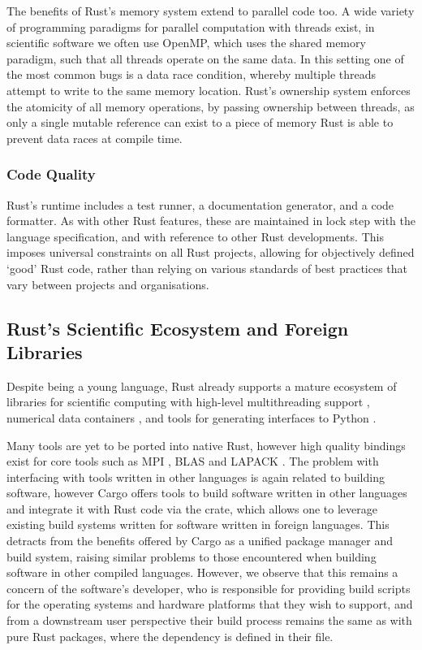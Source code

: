 The benefits of Rust's memory system extend to parallel code too. A wide variety of programming paradigms for parallel computation with threads exist, in scientific software we often use OpenMP, which uses the shared memory paradigm, such that all threads operate on the same data. In this setting one of the most common bugs is a data race condition, whereby multiple threads attempt to write to the same memory location. Rust's ownership system enforces the atomicity of all memory operations, by passing ownership between threads, as only a single mutable reference can exist to a piece of memory Rust is able to prevent data races at compile time.

\subsubsection*{Code Quality}

Rust's runtime includes a test runner, a documentation generator, and a code formatter. As with other Rust features, these are maintained in lock step with the language specification, and with reference to other Rust developments. This imposes universal constraints on all Rust projects, allowing for objectively defined `good' Rust code, rather than relying on various standards of best practices that vary between projects and organisations.

\subsection*{Rust's Scientific Ecosystem and Foreign Libraries}

Despite being a young language, Rust already supports a mature ecosystem of libraries for scientific computing with high-level multithreading support \cite{rayon2018github}, numerical data containers \cite{ndarray2022github}, and tools for generating interfaces to Python \cite{maturin2022github}.

Many tools are yet to be ported into native Rust, however high quality bindings exist for core tools such as MPI \cite{rsmpi2018github}, BLAS and LAPACK \cite{blaslapackrust2022github}. The problem with interfacing with tools written in other languages is again related to building software, however Cargo offers tools to build software written in other languages and integrate it with Rust code via the  crate, which allows one to leverage existing build systems written for software written in foreign languages. This detracts from the benefits offered by Cargo as a unified package manager and build system, raising similar problems to those encountered when building software in other compiled languages. However, we observe that this remains a concern of the software's developer, who is responsible for providing build scripts for the operating systems and hardware platforms that they wish to support, and from a downstream user perspective their build process remains the same as with pure Rust packages, where the dependency is defined in their  file.


